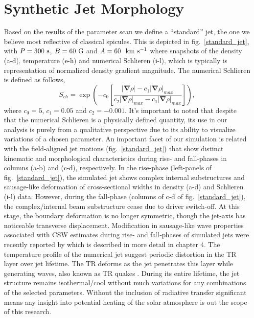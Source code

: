 \documentclass[12pt]{ociamthesis}
\newcommand{\kms}{~\rm{km ~s^{-1}}}
\newcommand{\np}{\\ \\}
\begin{document}
\section{Synthetic Jet Morphology}
Based on the results of the parameter scan we define a ``standard'' jet, the one we believe most reflective of classical spicules. This is depicted in fig.~\ref{standard_jet}, with $P=300~\rm{s}$, $B=60~\rm{G}$ and $A=60~\kms$ where snapshots of the density (a-d), temperature (e-h) and numerical Schlieren (i-l), which is typically is representation of normalized density gradient magnitude. The numerical Schlieren is defined as follows,
\begin{equation}
    S_{ch} = \exp{\left( -c_0 \left[ \frac{|\boldsymbol{\nabla} \rho|-c_1 |\boldsymbol{\nabla} \rho|_{max}}{c_2 |\boldsymbol{\nabla} \rho|_{max}-c_1|\boldsymbol{\nabla} \rho|_{max}} \right] \right)}, 
\end{equation}
where $c_0=5$, $c_1=0.05$ and $c_2=-0.001$. It's important to noted that despite that the numerical Schlieren is a physically defined quantity, its use in our analysis is purely from a qualitative perspective due to its ability to visualize variations of a chosen parameter. An important facet of our simulation is related with the field-aligned jet motions (fig.~\ref{standard_jet}) that show distinct kinematic and morphological characteristics during rise- and fall-phases in columns (a-b) and (c-d), respectively. In the rise-phase (left-panels of fig.~\ref{standard_jet}), the simulated jet shows complex internal substructures and sausage-like deformation of cross-sectional widths in density (a-d) and Schlieren (i-l) data. However, during the fall-phase (columns of c-d of fig.~\ref{standard_jet}), the complex/internal beam substructure cease due to driver switch-off. At this stage, the boundary deformation is no longer symmetric, though the jet-axis has noticeable transverse displacement. Modification in sausage-like wave properties associated with CSW estimates during rise- and fall-phases of simulated jets were recently reported by \citep{Mackenzie_Dover_2020} which is described in more detail in chapter 4. The temperature profile of the numerical jet suggest periodic distortion in the TR layer over jet lifetime. The TR deforms as the jet penetrates this layer while generating waves, also known as TR quakes \citep{Scullion2011ApJ74314S}. During its entire lifetime, the jet structure remains isothermal/cool without much variations for any combinations of the selected parameters. Without the inclusion of radiative transfer significant means any insight into potential heating of the solar atmosphere is out the scope of this research. \np
\end{document}
